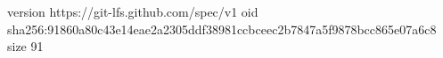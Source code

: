 version https://git-lfs.github.com/spec/v1
oid sha256:91860a80c43e14eae2a2305ddf38981ccbceec2b7847a5f9878bcc865e07a6c8
size 91
